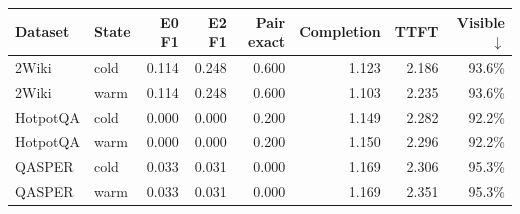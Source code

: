\begin{tabular}{llrrrrrr}
\toprule
Dataset & State & E0 F1 & E2 F1 & Pair exact & Completion & TTFT & Visible $\downarrow$ \\
\midrule
2Wiki & cold & 0.114 & 0.248 & 0.600 & 1.123 & 2.186 & 93.6\% \\
2Wiki & warm & 0.114 & 0.248 & 0.600 & 1.103 & 2.235 & 93.6\% \\
HotpotQA & cold & 0.000 & 0.000 & 0.200 & 1.149 & 2.282 & 92.2\% \\
HotpotQA & warm & 0.000 & 0.000 & 0.200 & 1.150 & 2.296 & 92.2\% \\
QASPER & cold & 0.033 & 0.031 & 0.000 & 1.169 & 2.306 & 95.3\% \\
QASPER & warm & 0.033 & 0.031 & 0.000 & 1.169 & 2.351 & 95.3\% \\
\bottomrule
\end{tabular}
